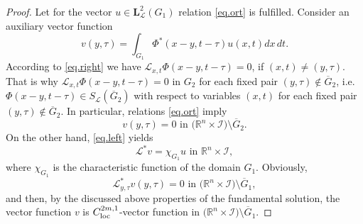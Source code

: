 \documentclass{amsart}
\theoremstyle{definition}
\theoremstyle{remark}
\numberwithin{equation}{section}
\begin{document}
\begin{proof}
Let for the vector $u\in \mathbf{L}^{2} _{\mathcal L}(G_1)$ relation 
\eqref{eq.ort} is fulfilled. Consider an auxiliary vector function
\begin{equation}
\label{eq.v}
v (y,\tau) = \int_{G_1} \Phi^*(x-y,t-\tau) u (x,t)   dx \, dt.  
\end{equation}
According to \eqref{eq.right} we have
${\mathcal L}_{x,t} \Phi(x-y,t-\tau) =0 $, if  $ (x,t) \ne (y,\tau)$. 
That is why 
${\mathcal L}_{x,t} \Phi(x-y,t-\tau) =0$ in $G_2$ 
for each fixed pair $(y,\tau) \not \in \overline G_2$, i.e. 
$\Phi(x-y,t-\tau) \in S_{\mathcal L}(\overline G_2)$ 
with respect to variables $(x,t)$ for each fixed 
pair  $(y,\tau) \not \in \overline G_2$. In particular, relations  \eqref{eq.ort}  imply 
\begin{equation} \label{eq.v1}
v (y,\tau) = 0 \mbox{ in } \Big({\mathbb R}^{n} \times \mathcal{I}\Big) \setminus \overline G_2. 
\end{equation}
On the other hand, \eqref{eq.left} yields  
\begin{equation} \label{eq.v0}
{\mathcal L}^*v    = \chi_{G_1} u \mbox{ in } {\mathbb R}^{n} \times \mathcal{I},
\end{equation}
where $\chi_{ G_1}$ is the characteristic function 
of the domain  $G_1$. Obviously, 
$$
{\mathcal L}^*_{y,\tau} v (y,\tau)=0 \mbox{ in  } \Big({\mathbb R}^{n} \times \mathcal{I}\Big) 
\setminus \overline G_1,
$$
and then, by the discussed above  properties of the fundamental solution, the vector function 
 $v$ is $C^{2m,1}_{\rm loc}$-vector function in 
$\Big({\mathbb R}^{n} \times \mathcal{I}\Big)  \setminus \overline G_1 $. 


\end{proof}
\end{document}
